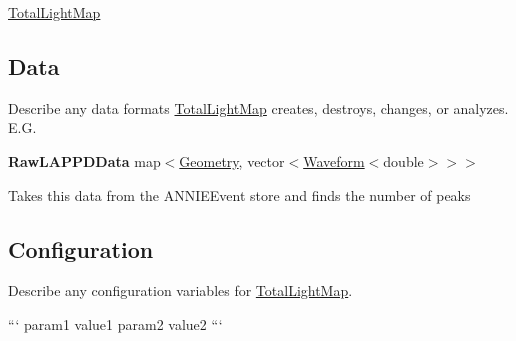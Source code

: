 \hyperlink{classTotalLightMap}{Total\-Light\-Map}

\subsection*{Data}

Describe any data formats \hyperlink{classTotalLightMap}{Total\-Light\-Map} creates, destroys, changes, or analyzes. E.\-G.

{\bfseries Raw\-L\-A\-P\-P\-D\-Data} {\ttfamily map$<$\hyperlink{classGeometry}{Geometry}, vector$<$\hyperlink{classWaveform}{Waveform}$<$double$>$$>$$>$}
\begin{DoxyItemize}
\item Takes this data from the {\ttfamily A\-N\-N\-I\-E\-Event} store and finds the number of peaks
\end{DoxyItemize}

\subsection*{Configuration}

Describe any configuration variables for \hyperlink{classTotalLightMap}{Total\-Light\-Map}.

``` param1 value1 param2 value2 ``` 